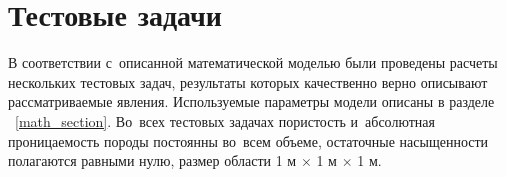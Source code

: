 %
\section{Тестовые задачи}
%
В соответствии с~описанной математической моделью были проведены расчеты
нескольких тестовых задач, результаты которых качественно верно описывают
рассматриваемые явления.
Используемые параметры модели описаны
в разделе ~\ref{math_section}. Во~всех тестовых задачах
пористость и~абсолютная проницаемость породы постоянны во~всем объеме,
остаточные насыщенности полагаются равными нулю, размер области 1 м $\times$ 1 м $\times$ 1 м.